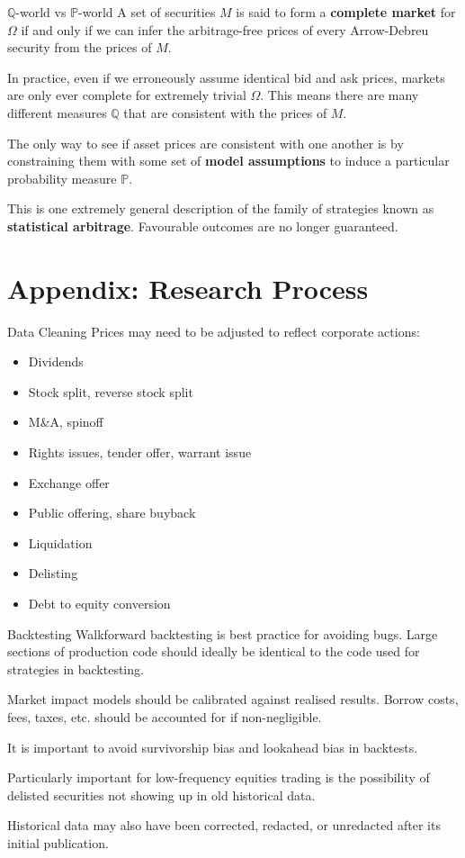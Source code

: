 \documentclass{beamer}
\begin{document}
\begin{frame}{$\mathbb{Q}$-world vs $\mathbb{P}$-world}
	A set of securities $M$ is said to form a \textbf{complete market} for $\Omega$ if and only if we can infer the arbitrage-free prices of every Arrow-Debreu security from the prices of $M$.

	In practice, even if we erroneously assume identical bid and ask prices, markets are only ever complete for extremely trivial $\Omega$. This means there are many different measures $\mathbb{Q}$ that are consistent with the prices of $M$.

	The only way to see if asset prices are consistent with one another is by constraining them with some set of \textbf{model assumptions} to induce a particular probability measure $\mathbb{P}$.

	This is one extremely general description of the family of strategies known as \textbf{statistical arbitrage}. Favourable outcomes are no longer guaranteed.
\end{frame}

\section{Appendix: Research Process}
\begin{frame}{Data Cleaning}
	Prices may need to be adjusted to reflect corporate actions:
	\begin{itemize}
		\item Dividends
		\item Stock split, reverse stock split
		\item M&A, spinoff
		\item Rights issues, tender offer, warrant issue
		\item Exchange offer
		\item Public offering, share buyback
		\item Liquidation
		\item Delisting
		\item Debt to equity conversion
	\end{itemize}
\end{frame}

\begin{frame}{Backtesting}
	Walkforward backtesting is best practice for avoiding bugs. Large sections of production code should ideally be identical to the code used for strategies in backtesting.

	Market impact models should be calibrated against realised results. Borrow costs, fees, taxes, etc. should be accounted for if non-negligible.

	It is important to avoid survivorship bias and lookahead bias in backtests.

	Particularly important for low-frequency equities trading is the possibility of delisted securities not showing up in old historical data.

	Historical data may also have been corrected, redacted, or unredacted after its initial publication.
\end{frame}
\end{document}
